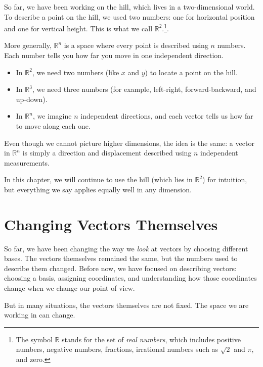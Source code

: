 \documentclass[11pt,openany]{book}
\theoremstyle{definition}
\begin{document}
    So far, we have been working on the hill, which lives in a two-dimensional world.
    To describe a point on the hill, we used two numbers: one for horizontal position
    and one for vertical height. This is what we call $\mathbb{R}^2$.\footnote{The symbol
$\mathbb{R}$ stands for the set of \textit{real numbers}, which includes positive
numbers, negative numbers, fractions, irrational numbers such as $\sqrt{2}$ and $\pi$,
and zero.}.

\medskip

More generally, $\mathbb{R}^n$ is a space where every point is described using $n$
numbers. Each number tells you how far you move in one independent direction.

\medskip

\begin{itemize}
  \item In $\mathbb{R}^2$, we need two numbers (like $x$ and $y$) to locate a point on the hill.
  \item In $\mathbb{R}^3$, we need three numbers (for example, left-right, forward-backward, and up-down).
  \item In $\mathbb{R}^n$, we imagine $n$ independent directions, and each vector tells us how far to move along each one.
\end{itemize}

\medskip

Even though we cannot picture higher dimensions, the idea is the same:
a vector in $\mathbb{R}^n$ is simply a direction and displacement described using $n$ independent measurements.

\medskip

In this chapter, we will continue to use the hill (which lies in $\mathbb{R}^2$)
for intuition, but everything we say applies equally well in any dimension.

\section{Changing Vectors Themselves}

So far, we have been changing the way we \textit{look} at vectors by choosing different bases.
The vectors themselves remained the same, but the numbers used to describe them changed.
Before now, we have focused on describing vectors: choosing a basis, assigning coordinates,
and understanding how those coordinates change when we change our point of view.

\medskip

But in many situations, the vectors themselves are not fixed. The space we are working in
can change.
\end{document}
